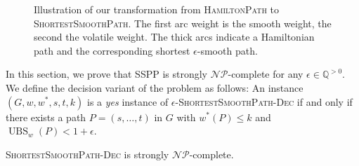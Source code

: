 \documentclass[a4paper,UKenglish,cleveref, autoref, thm-restate]{lipics-v2021}
\newcommand*{\ubs}{\operatorname{UBS}}
\begin{document}
\begin{figure}
\caption{Illustration of our transformation from \textsc{HamiltonPath} to \textsc{ShortestSmoothPath}.
The first arc weight is the smooth weight, the second the volatile weight.
The thick arcs indicate a Hamiltonian path and the corresponding shortest $\epsilon$-smooth path.}
\label{fig:transformation}
\end{figure}

In this section, we prove that SSPP is strongly $\mathcal{NP}$-complete for any $\epsilon \in \mathbb{Q}^{>0}$.
We define the decision variant of the problem as follows:
An instance $(G, w, w^*, s, t, k)$ is a \emph{yes} instance of $\epsilon$-\textsc{ShortestSmoothPath-Dec} if and only if there exists a path $P = (s,\dots, t)$ in $G$ with $w^*(P) \leq k$ and $\ubs_w(P) < 1 + \epsilon$.

\begin{theorem}
\textsc{ShortestSmoothPath-Dec} is strongly $\mathcal{NP}$-complete.
\end{theorem}
\end{document}
